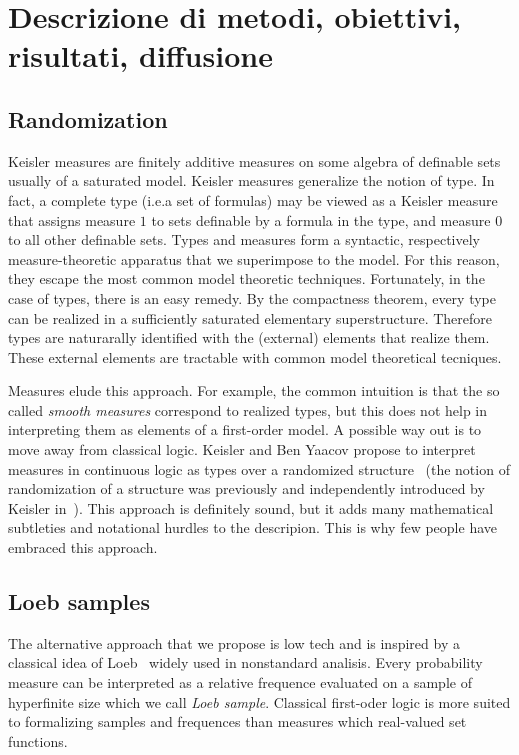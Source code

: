 \documentclass[10pt]{article}
\begin{document}
\section{Descrizione di metodi, obiettivi, risultati, diffusione}

\subsection{Randomization}
Keisler measures are finitely additive measures on some algebra of definable sets usually of a saturated model.
Keisler measures generalize the notion of type. 
In fact, a complete type (i.e.\@ a set of formulas) may be viewed as a Keisler measure that assigns measure $1$ to sets definable by a formula in the type, and measure $0$ to all other definable sets.
Types and measures form a syntactic, respectively measure-theoretic apparatus that we superimpose to the model. 
For this reason, they escape the most common model theoretic techniques.
Fortunately, in the case of types, there is an easy remedy.
By the compactness theorem, every type can be realized in a sufficiently saturated elementary superstructure.
Therefore types are naturarally identified with the (external) elements that realize them.
These external elements are tractable with common model theoretical tecniques.

Measures elude this approach. 
For example, the common intuition is that the so called \textit{smooth measures\/} correspond to realized types, but this does not help in interpreting them as elements of a first-order model.
A possible way out is to move away from classical logic. 
Keisler and Ben Yaacov propose to interpret measures in continuous logic as types over a randomized structure~\cite{MR2561997} (the notion of randomization of a structure was previously and independently introduced by Keisler in~\cite{MR1680650}).
This approach is definitely sound, but it adds many mathematical subtleties and notational hurdles to the descripion.
This is why few people have embraced this approach.

\subsection{Loeb samples}

The alternative approach that we propose is low tech and is inspired by a classical idea of Loeb~\cite{MR1680650} widely used in nonstandard analisis.
Every probability measure can be interpreted as a relative frequence evaluated on a sample of hyperfinite size which we call \emph{Loeb sample}.
Classical first-oder logic is more suited to formalizing samples and frequences than measures which real-valued set functions.
\end{document}
